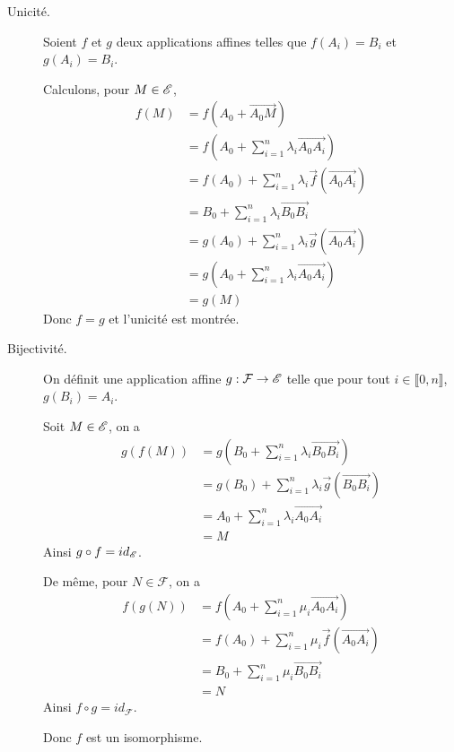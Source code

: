 \documentclass[a4paper, 12pt]{article}
\begin{document}
\begin{demonstration}
    \begin{description}
        \item[Unicité.] 
        Soient $f$ et $g$ deux applications affines telles que $f(A_i) = B_i$ et $g(A_i) = B_i$.
        
        Calculons, pour $M \in \mathscr{E}$,
        \begin{align*}
            f(M) &= f(A_0 + \overrightarrow{A_0 M}) \\
            &= f\left(A_0 + \sum_{i=1}^n \lambda_i \overrightarrow{A_0 A_i}\right) \\
            &= f(A_0) + \sum_{i=1}^n \lambda_i \vec{f}(\overrightarrow{A_0 A_i}) \\
            &= B_0 + \sum_{i=1}^n \lambda_i \overrightarrow{B_0 B_i} \\
            &= g(A_0) + \sum_{i=1}^n \lambda_i \vec{g}(\overrightarrow{A_0 A_i}) \\
            &= g\left(A_0 + \sum_{i=1}^n \lambda_i \overrightarrow{A_0 A_i}\right) \\
            &= g(M)
        \end{align*}
        Donc $f = g$ et l'unicité est montrée.

        \item[Bijectivité.]
        On définit une application affine $g: \mathcal{F} \to \mathscr{E}$ telle que pour tout $i \in \llbracket 0, n \rrbracket$, $g(B_i) = A_i$.
        
        Soit $M \in \mathscr{E}$, on a
        \begin{align*}
            g(f(M)) &= g\left(B_0 + \sum_{i=1}^n \lambda_i \overrightarrow{B_0 B_i}\right) \\
            &= g(B_0) + \sum_{i=1}^n \lambda_i \vec{g}(\overrightarrow{B_0 B_i}) \\
            &= A_0 + \sum_{i=1}^n \lambda_i \overrightarrow{A_0 A_i} \\
            &= M
        \end{align*}
        Ainsi $g \circ f = id_{\mathscr{E}}$.

        De même, pour $N \in \mathcal{F}$, on a
        \begin{align*}
            f(g(N)) &= f\left(A_0 + \sum_{i=1}^n \mu_i \overrightarrow{A_0 A_i}\right) \\
            &= f(A_0) + \sum_{i=1}^n \mu_i \vec{f}(\overrightarrow{A_0 A_i}) \\
            &= B_0 + \sum_{i=1}^n \mu_i \overrightarrow{B_0 B_i} \\
            &= N
        \end{align*}
        Ainsi $f \circ g = id_{\mathcal{F}}$.

        Donc $f$ est un isomorphisme.
\end{description}
\end{demonstration}
\end{document}
